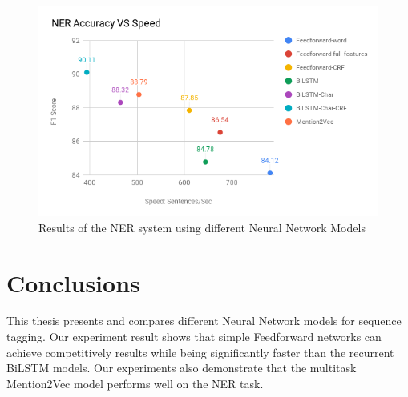 \documentclass{sfuthesis}
\begin{document}
\begin{figure}
  \centering
  \includegraphics[scale=0.7]{ner.png}
 \caption{Results of the NER system using different Neural Network Models}
  \label{fig:ner}
\end{figure}

\chapter{Conclusions}

This thesis presents and compares different Neural Network models for sequence tagging. Our experiment result shows that simple Feedforward networks can achieve competitively results while being significantly faster than the recurrent BiLSTM models. Our experiments also demonstrate that the multitask Mention2Vec model performs well on the NER task.


%
%
%
%
%

\cleardoublepage
{}
{}
%


	

\end{document}
